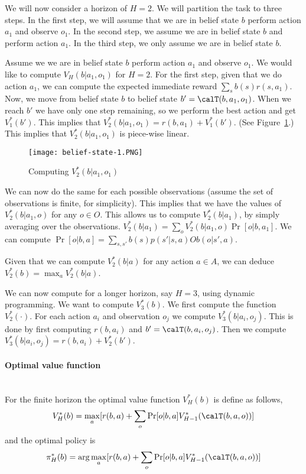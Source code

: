 We will now consider a horizon of $H=2$. We will partition the task
to three steps. In the first step, we will assume that we are in
belief state $b$ perform action $a_1$ and observe $o_1$. In the
second step, we assume we are in belief state $b$ and perform action
$a_1$. In the third step, we only assume we are in belief state $b$.

Assume we  we are in belief state $b$ perform action $a_1$ and
observe $o_1$. We would like to compute $V_H(b|a_1,o_1)$ for $H=2$.
For the first step, given that we do action $a_1$, we can compute
the expected immediate reward $\sum_s b(s)r(s,a_1)$. Now, we move
from belief state $b$ to belief state $b'=\calT(b,a_1,o_1)$. When we
reach $b'$ we have only one step remaining, so we perform the best
action and get $V^*_1(b')$. This implies that
$V^*_2(b|a_1,o_1)=r(b,a_1)+V^*_1(b')$. (See
Figure~\ref{fig:belief-state-1}.) This implies that
$V^*_2(b|a_1,o_1)$ is piece-wise linear.

\begin{figure}
  \begin{centering}
  \texttt{[image: belief-state-1.PNG]}\\
  \caption{Computing $V^*_2(b|a_1,o_1)$}\label{fig:belief-state-1}
  \end{centering}
\end{figure}

We can now do the same for each possible observations (assume the
set of observations is finite, for simplicity). This implies that we
have the values of $V^*_2(b|a_1,o)$ for any $o\in O$. This allows us
to compute $V^*_2(b|a_1)$, by simply averaging over the
observations. $V^*_2(b|a_1)=\sum_o V^*_2(b|a_1,o)\Pr[o|b,a_1]$. We
can compute $\Pr[o|b,a]=\sum_{s,s'} b(s)p(s'|s,a)Ob(o|s',a)$.

Given that we can compute $V_2^*(b|a)$ for any action $a\in A$, we
can deduce $V_2^*(b)=\max_a V_2^*(b|a)$.

We can now compute for a longer horizon, say $H=3$, using dynamic
programming. We want to compute $V^*_3(b)$. We first compute the
function $V_2^*(\cdot)$. For each action $a_i$ and observation $o_j$
we compute $V^*_3(b|a_i,o_j)$. This is done by first computing
$r(b,a_i)$ and $b'=\calT(b,a_i,o_j)$. Then we compute
$V^*_3(b|a_i,o_j) = r(b,a_i)+V^*_2(b')$.

\paragraph{Optimal value function}\ \\
For the finite horizon the optimal value function $V^*_H(b)$ is
define as follows,
\[
V^*_H(b)=\max_a [r(b,a)+\sum_o \Pr[o|b,a]V^*_{H-1}(\calT(b,a,o))]
\]
and the optimal policy is
\[
\pi_H^*(b)=\arg\max_a [r(b,a)+\sum_o
\Pr[o|b,a]V^*_{H-1}(\calT(b,a,o))]
\]

